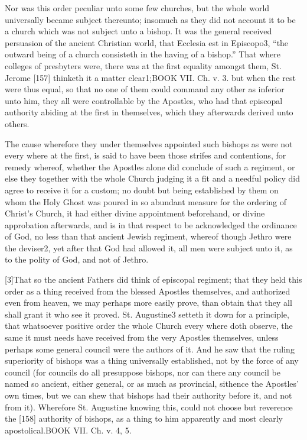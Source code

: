 Nor was this order peculiar unto some few churches, but the whole world universally became subject thereunto; insomuch as they did not account it to be a church which was not subject unto a bishop. It was the general received persuasion of the ancient Christian world, that Ecclesia est in Episcopo3, “the outward being of a church consisteth in the having of a bishop.” That where colleges of presbyters were, there was at the first equality amongst them, St. Jerome [157] thinketh it a matter clear1;BOOK VII. Ch. v. 3. but when the rest were thus equal, so that no one of them could command any other as inferior unto him, they all were controllable by the Apostles, who had that episcopal authority abiding at the first in themselves, which they afterwards derived unto others.

The cause wherefore they under themselves appointed such bishops as were not every where at the first, is said to have been those strifes and contentions, for remedy whereof, whether the Apostles alone did conclude of such a regiment, or else they together with the whole Church judging it a fit and a needful policy did agree to receive it for a custom; no doubt but being established by them on whom the Holy Ghost was poured in so abundant measure for the ordering of Christ’s Church, it had either divine appointment beforehand, or divine approbation afterwards, and is in that respect to be acknowledged the ordinance of God, no less than that ancient Jewish regiment, whereof though Jethro were the deviser2, yet after that God had allowed it, all men were subject unto it, as to the polity of God, and not of Jethro.

[3]That so the ancient Fathers did think of episcopal regiment; that they held this order as a thing received from the blessed Apostles themselves, and authorized even from heaven, we may perhaps more easily prove, than obtain that they all shall grant it who see it proved. St. Augustine3 setteth it down for a principle, that whatsoever positive order the whole Church every where doth observe, the same it must needs have received from the very Apostles themselves, unless perhaps some general council were the authors of it. And he saw that the ruling superiority of bishops was a thing universally established, not by the force of any council (for councils do all presuppose bishops, nor can there any council be named so ancient, either general, or as much as provincial, sithence the Apostles’ own times, but we can shew that bishops had their authority before it, and not from it). Wherefore St. Augustine knowing this, could not choose but reverence the [158] authority of bishops, as a thing to him apparently and most clearly apostolical.BOOK VII. Ch. v. 4, 5.

